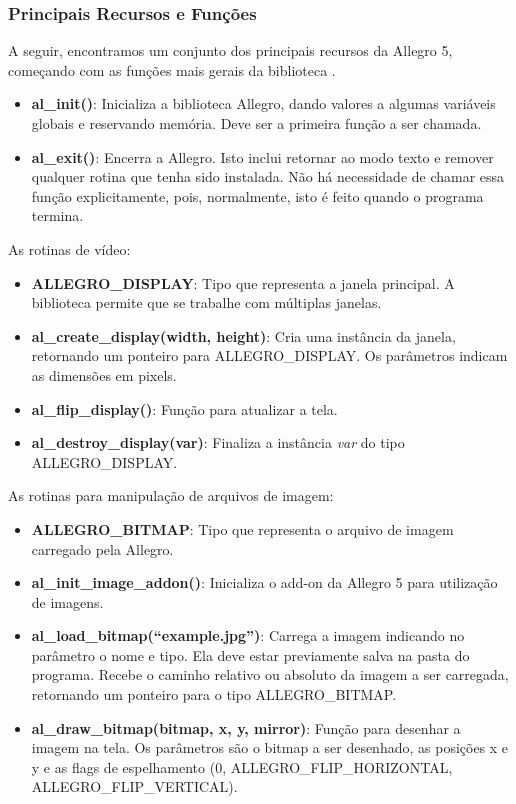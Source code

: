 \subsubsection{Principais Recursos e Funções}
%
A seguir, encontramos um conjunto dos principais recursos da Allegro 5, começando com as funções mais gerais da biblioteca \cite{AllegroDoc}.
%
\begin{itemize}
 \item \textbf{al\_init()}: Inicializa a biblioteca Allegro, dando valores a algumas variáveis globais e reservando memória. 
 Deve ser a primeira função a ser chamada.
 \item \textbf{al\_exit()}: Encerra a Allegro. Isto inclui retornar ao modo texto e remover qualquer rotina que tenha sido instalada. 
 Não há necessidade de chamar essa função explicitamente, pois, normalmente, isto é feito quando o programa termina.
\end{itemize}
%
As rotinas de vídeo:
%
\begin{itemize}
 \item \textbf{ALLEGRO\_DISPLAY}: Tipo que representa a janela principal. A biblioteca permite que se trabalhe com múltiplas janelas.
 \item \textbf{al\_create\_display(width, height)}: Cria uma instância da janela, retornando um ponteiro para ALLEGRO\_DISPLAY. 
 Os parâmetros indicam as dimensões em pixels.
 \item \textbf{al\_flip\_display()}: Função para atualizar a tela.
 \item \textbf{al\_destroy\_display(var)}: Finaliza a instância \textit{var} do tipo ALLEGRO\_DISPLAY\*.
\end{itemize}
%
As rotinas para manipulação de arquivos de imagem:
%
\begin{itemize}
 \item \textbf{ALLEGRO\_BITMAP}: Tipo que representa o arquivo de imagem carregado pela Allegro.
 \item \textbf{al\_init\_image\_addon()}: Inicializa o add-on da Allegro 5 para utilização de imagens.
 \item \textbf{al\_load\_bitmap(``example.jpg'')}: Carrega a imagem indicando no parâmetro o nome e tipo. Ela deve estar previamente salva na pasta 
 do programa. Recebe o caminho relativo ou absoluto da imagem a ser carregada, retornando um ponteiro para o tipo ALLEGRO\_BITMAP.
 \item \textbf{al\_draw\_bitmap(bitmap, x, y, mirror)}: Função para desenhar a imagem na tela. Os parâmetros são o bitmap a ser desenhado, as 
 posições x e y e as flags de espelhamento (0, ALLEGRO\_FLIP\_HORIZONTAL, ALLEGRO\_FLIP\_VERTICAL).
\end{itemize}
